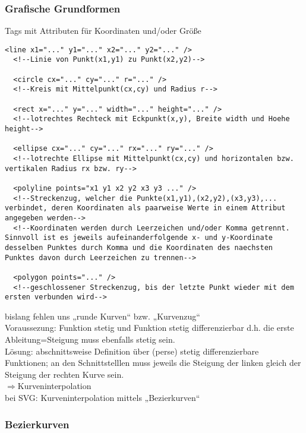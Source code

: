 \subsubsection{Grafische Grundformen}
Tags mit Attributen für Koordinaten und/oder Größe
\begin{lstlisting}[caption={Syntax von grafischen Grundformen in SVG}, label={lst:Grundger:SVG}, language={SVG}]
  <line x1="..." y1="..." x2="..." y2="..." />
  <!--Linie von Punkt(x1,y1) zu Punkt(x2,y2)-->
  
  <circle cx="..." cy="..." r="..." />
  <!--Kreis mit Mittelpunkt(cx,cy) und Radius r-->
  
  <rect x="..." y="..." width="..." height="..." />
  <!--lotrechtes Rechteck mit Eckpunkt(x,y), Breite width und Hoehe height-->
  
  <ellipse cx="..." cy="..." rx="..." ry="..." />
  <!--lotrechte Ellipse mit Mittelpunkt(cx,cy) und horizontalen bzw. vertikalen Radius rx bzw. ry-->
  
  <polyline points="x1 y1 x2 y2 x3 y3 ..." />
  <!--Streckenzug, welcher die Punkte(x1,y1),(x2,y2),(x3,y3),... verbindet, deren Koordinaten als paarweise Werte in einem Attribut angegeben werden-->
  <!--Koordinaten werden durch Leerzeichen und/oder Komma getrennt. Sinnvoll ist es jeweils aufeinanderfolgende x- und y-Koordinate desselben Punktes durch Komma und die Koordinaten des naechsten Punktes davon durch Leerzeichen zu trennen-->
  
  <polygon points="..." />
  <!--geschlossener Streckenzug, bis der letzte Punkt wieder mit dem ersten verbunden wird-->
\end{lstlisting}
bislang fehlen uns „runde Kurven“ bzw. „Kurvenzug“\\
Voraussezung: Funktion stetig und Funktion stetig differenzierbar d.h. die erste Ableitung=Steigung muss ebenfalls stetig sein.\\
Lösung: abschnittsweise Definition über (perse) stetig differenzierbare Funktionen; an den Schnittstelllen muss jeweils die Steigung der linken gleich der Steigung der rechten Kurve sein.\\
$\Rightarrow$Kurveninterpolation\\
bei SVG: Kurveninterpolation mittels „Bezierkurven“\\

\subsubsection{Bezierkurven}
